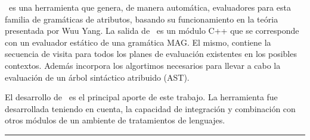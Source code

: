 \documentclass[a4paper,11pt]{ThesisStyle}
\begin{document}
\begin{vcenterpage}
\maggen\ es una herramienta que genera, de manera automática, evaluadores para esta familia de gramáticas de atributos, basando su funcionamiento en la teória presentada por Wuu Yang. La salida de \maggen\ es un módulo C++ que se corresponde con un evaluador estático de una gramática MAG. El mismo, contiene la secuencia de visita para todos los planes de evaluación existentes en los posibles contextos. Además incorpora los algortimos necesarios para llevar a cabo la evaluación de un árbol sintáctico atribuido (AST).

El desarrollo de \maggen\ es el principal aporte de este trabajo. La herramienta fue desarrollada teniendo en cuenta, la capacidad de integración y combinación con otros módulos de un ambiente de tratamientos de lenguajes.

% 

\noindent\rule[2pt]{\textwidth}{0.5pt}

\end{vcenterpage}

\cleardoublepage
\end{document}

